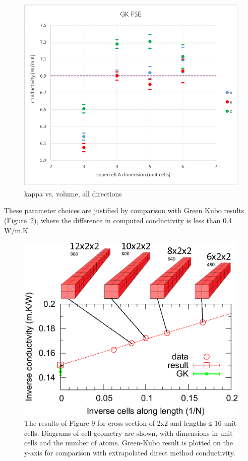 \documentclass[%
preprint,                                  %
nofootinbib,
 amsmath,amssymb,
 aps,
]{revtex4-1}
\begin{document}
\begin{figure}[h!]
  \includegraphics[width=\linewidth]{images/gk_fse_draft.png}
  \caption{kappa vs. volume, all directions}
  \label{fig:gk_fse}
\end{figure}

These parameter choices are justified by comparison with Green Kubo results (Figure~\ref{fig:gk-direct}), where the difference in computed conductivity is less than 0.4 W/m.K.

\begin{figure}[h!]
  \includegraphics[width=\linewidth]{images/gk-direct.png}
  \caption{The results of Figure 9 for cross-section of 2x2 and lengths ≤ 16 unit cells. Diagrams of cell geometry are shown, with dimensions in unit cells and the number of atoms. Green-Kubo result is plotted on the y-axis for comparison with extrapolated direct method conductivity.}
  \label{fig:gk-direct}
\end{figure}
\end{document}
